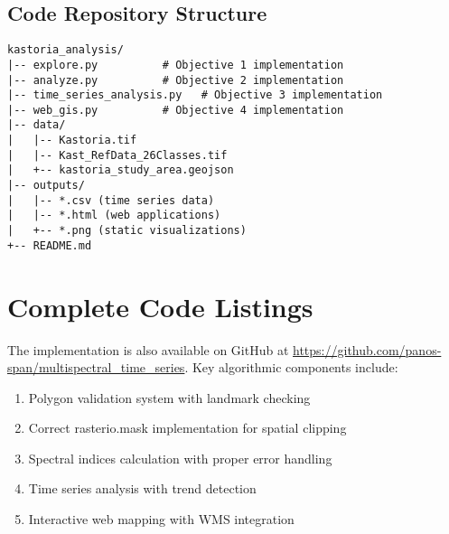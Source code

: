 \documentclass[a4paper,12pt]{article}
\begin{document}
\subsection{Code Repository Structure}

\begin{verbatim}
kastoria_analysis/
|-- explore.py          # Objective 1 implementation
|-- analyze.py          # Objective 2 implementation  
|-- time_series_analysis.py   # Objective 3 implementation
|-- web_gis.py          # Objective 4 implementation
|-- data/
|   |-- Kastoria.tif
|   |-- Kast_RefData_26Classes.tif
|   +-- kastoria_study_area.geojson
|-- outputs/
|   |-- *.csv (time series data)
|   |-- *.html (web applications)
|   +-- *.png (static visualizations)
+-- README.md
\end{verbatim}

\section{Complete Code Listings}

The implementation is also available on GitHub at
\url{https://github.com/panos-span/multispectral_time_series}. Key algorithmic
components include:

\begin{enumerate}
    \item Polygon validation system with landmark checking
    \item Correct rasterio.mask implementation for spatial clipping
    \item Spectral indices calculation with proper error handling
    \item Time series analysis with trend detection
    \item Interactive web mapping with WMS integration
\end{enumerate}
\end{document}
